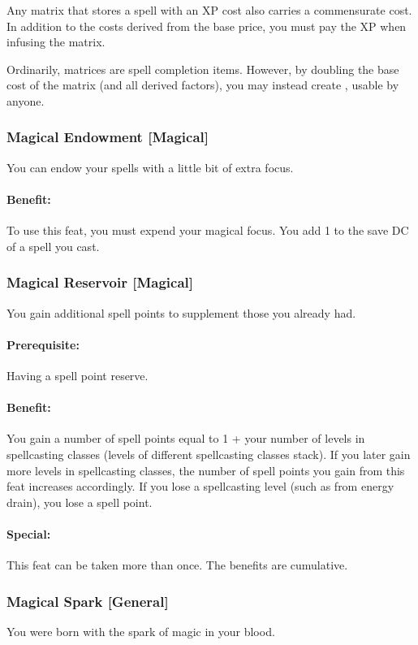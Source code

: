 Any matrix that stores a spell with an XP cost also carries a commensurate cost. 
In addition to the costs derived from the base price, you must pay the XP when infusing the matrix.

Ordinarily, matrices are spell completion items. 
However, by doubling the base cost of the matrix (and all derived factors), you may instead create , usable by anyone.
\subsubsection[Magical Endowment]{Magical Endowment [Magical]}
\label{Feat:MagicalEndowment}
You can endow your spells with a little bit of extra focus.

\paragraph{Benefit:} To use this feat, you must expend your magical focus. You add 1 to the save DC of a spell you cast.

\subsubsection[Magical Reservoir]{Magical Reservoir [Magical]}
\label{Feat:MagicallyGifted}
You gain additional spell points to supplement those you already had.

\paragraph{Prerequisite:} Having a spell point reserve.

\paragraph{Benefit:} You gain a number of spell points equal to 1 + your number of levels in spellcasting classes (levels of different spellcasting classes stack). If you later gain more levels in spellcasting classes, the number of spell points you gain from this feat increases accordingly. If you lose a spellcasting level (such as from energy drain), you lose a spell point.

\paragraph{Special:} This feat can be taken more than once. The benefits are cumulative.

\subsubsection[Magical Spark]{Magical Spark [General]}
\label{Feat:MagicalSpark}
You were born with the spark of magic in your blood.

